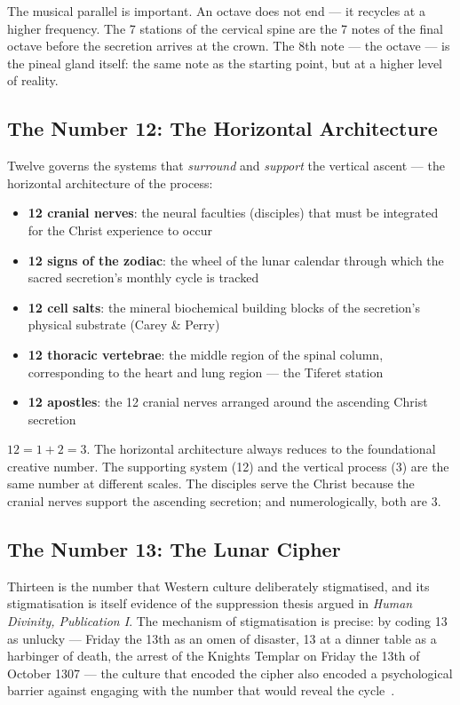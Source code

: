 \documentclass[12pt, a4paper]{article}
\begin{document}
The musical parallel is important. An octave does not end — it recycles at a
higher frequency. The 7 stations of the cervical spine are the 7 notes of the
final octave before the secretion arrives at the crown. The 8th note — the
octave — is the pineal gland itself: the same note as the starting point, but
at a higher level of reality.

\subsection{The Number 12: The Horizontal Architecture}

Twelve governs the systems that \emph{surround} and \emph{support} the
vertical ascent — the horizontal architecture of the process:

\begin{itemize}[leftmargin=1.5cm]
  \item \textbf{12 cranial nerves}: the neural faculties (disciples) that must be
  integrated for the Christ experience to occur
  \item \textbf{12 signs of the zodiac}: the wheel of the lunar calendar through
  which the sacred secretion's monthly cycle is tracked
  \item \textbf{12 cell salts}: the mineral biochemical building blocks of the
  secretion's physical substrate (Carey \& Perry)
  \item \textbf{12 thoracic vertebrae}: the middle region of the spinal column,
  corresponding to the heart and lung region — the Tiferet station
  \item \textbf{12 apostles}: the 12 cranial nerves arranged around the ascending
  Christ secretion
\end{itemize}

$12 = 1 + 2 = 3$. The horizontal architecture always reduces to the foundational
creative number. The supporting system (12) and the vertical process (3) are
the same number at different scales. The disciples serve the Christ because the
cranial nerves support the ascending secretion; and numerologically, both are 3.

\subsection{The Number 13: The Lunar Cipher}

Thirteen is the number that Western culture deliberately stigmatised, and its
stigmatisation is itself evidence of the suppression thesis argued in
\emph{Human Divinity, Publication I}. The mechanism of stigmatisation is
precise: by coding 13 as unlucky — Friday the 13th as an omen of disaster, 13
at a dinner table as a harbinger of death, the arrest of the Knights Templar
on Friday the 13th of October 1307 — the culture that encoded the cipher also
encoded a psychological barrier against engaging with the number that would
reveal the cycle~\autocite{campion2008}.
\end{document}
